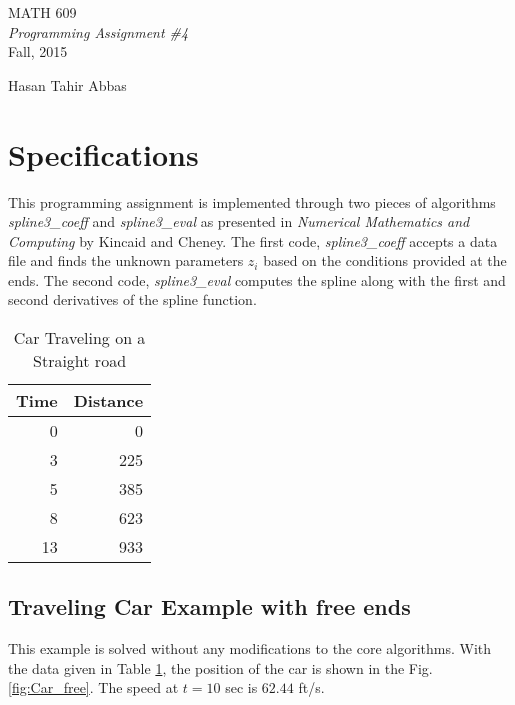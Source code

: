 \documentclass[11pt]{article}
\author{Hasan Tahir Abbas}
\begin{document}
\begin{titlepage}

\vspace*{55mm}
\begin{center}
{\huge MATH 609}\\[1cm]
{\em \huge Programming Assignment \#4}\\[70mm]
{\large Fall, 2015} \\[15mm]
\end{center}

\begin{flushright}
{\LARGE Hasan Tahir Abbas}
\end{flushright}

\vfill

\end{titlepage}
%
%
%
%
\newpage
\section{Specifications}

This programming assignment is implemented through two pieces of algorithms \textit{spline3\_coeff} and \textit{spline3\_eval} as presented in \textit{Numerical Mathematics and Computing} by Kincaid and Cheney. The first code, \textit{spline3\_coeff} accepts a data file and finds the unknown parameters $z_i$ based on the conditions provided at the ends. The second code, \textit{spline3\_eval} computes the spline along with the first and second derivatives of the spline function.

\begin{table}[htbp]
  \centering
\caption{Car Traveling on a Straight road}
    \begin{tabular}{rr}
    \toprule
    Time & Distance\\
    \midrule
    0     & 0 \\
    3     & 225 \\
    5     & 385 \\
    8     & 623 \\
    13    & 933 \\
    \bottomrule
    \end{tabular}%
\label{tab:Car}
\end{table}%


\subsection{Traveling Car Example with free ends}

This example is solved without any modifications to the core algorithms. With the data given in Table \ref{tab:Car}, the position of the car is shown in the Fig. \ref{fig:Car_free}. The speed at $t = 10$ sec is $62.44$ ft/s.
\end{document}
